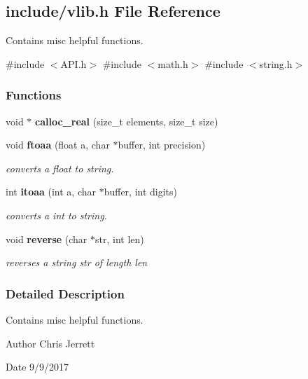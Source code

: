 \subsection{include/vlib.h File Reference}
\label{a00071}


Contains misc helpful functions.  


{\ttfamily \#include $<$A\+P\+I.\+h$>$}\newline
{\ttfamily \#include $<$math.\+h$>$}\newline
{\ttfamily \#include $<$string.\+h$>$}\newline
\subsubsection*{Functions}
\begin{DoxyCompactItemize}
\item 
void $\ast$ \textbf{ calloc\+\_\+real} (size\+\_\+t elements, size\+\_\+t size)
\item 
void \textbf{ ftoaa} (float a, char $\ast$buffer, int precision)
\begin{DoxyCompactList}\small\item\em converts a float to string. \end{DoxyCompactList}\item 
int \textbf{ itoaa} (int a, char $\ast$buffer, int digits)
\begin{DoxyCompactList}\small\item\em converts a int to string. \end{DoxyCompactList}\item 
void \textbf{ reverse} (char $\ast$str, int len)
\begin{DoxyCompactList}\small\item\em reverses a string \textquotesingle{}str\textquotesingle{} of length \textquotesingle{}len\textquotesingle{} \end{DoxyCompactList}\end{DoxyCompactItemize}


\subsubsection{Detailed Description}
Contains misc helpful functions. 

\begin{DoxyAuthor}{Author}
Chris Jerrett 
\end{DoxyAuthor}
\begin{DoxyDate}{Date}
9/9/2017 
\end{DoxyDate}


